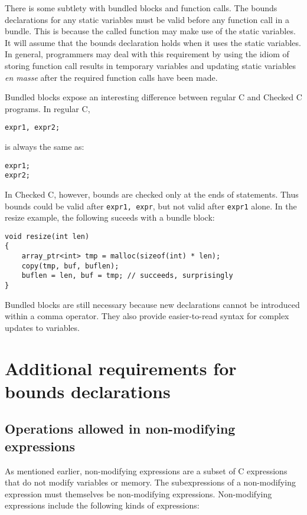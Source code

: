 There is some subtlety with bundled blocks and function calls. The
bounds declarations for any static variables must be valid before any
function call in a bundle. This is because the called function may make
use of the static variables. It will assume that the bounds declaration
holds when it uses the static variables. In general, programmers may
deal with this requirement by using the idiom of storing function call
results in temporary variables and updating static variables \textit{en
masse} after the required function calls have been made.

Bundled blocks expose an interesting difference between regular C
and Checked C programs.  In regular C, 
\begin{lstlisting}
expr1, expr2;
\end{lstlisting}

is always the same as:

\begin{lstlisting}
expr1;
expr2;
\end{lstlisting}

In Checked C, however, bounds are checked only at the ends of
statements.  Thus bounds could be valid after
\lstinline+expr1, expr+, but not valid after \lstinline+expr1+ alone.
In the resize example, the following suceeds with a bundle
block:
\begin{lstlisting}
void resize(int len) 
{
    array_ptr<int> tmp = malloc(sizeof(int) * len);
    copy(tmp, buf, buflen);
    buflen = len, buf = tmp; // succeeds, surprisingly
}
\end{lstlisting}
Bundled blocks are still necessary because new declarations
cannot be introduced within a comma operator.  They also provide
easier-to-read syntax for complex updates to variables.

\section{Additional requirements for bounds declarations}

\subsection{Operations allowed in non-modifying expressions}
\label{section:non-modifying-expressions}

As mentioned earlier, non-modifying expressions are a subset of C
expressions that do not modify variables or memory. The subexpressions
of a non-modifying expression must themselves be non-modifying
expressions. Non-modifying expressions include the following kinds of
expressions:

